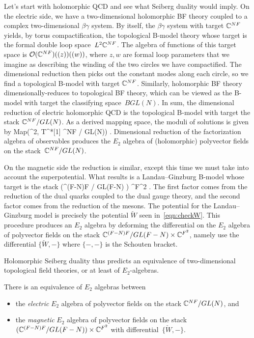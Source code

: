 \documentclass[11pt]{amsart}
\begin{document}
Let's start with holomorphic QCD and see what Seiberg duality would imply.
On the electric side, 
we have a two-dimensional holomorphic BF theory coupled to a complex two-dimensional $\beta\gamma$ system.
By itself, the $\beta\gamma$ system with target ${\mathbb{C}}^{NF}$ yields, by torus compactification, 
the topological B-model theory whose target is the formal double loop space~$L^2{\mathbb{C}}^{NF}$. 
The algebra of functions of this target space is $\mathcal O({\mathbb{C}}^{NF}) ((z))((w))$, 
where $z,w$ are formal loop parameters that we imagine as describing the winding of the two circles we have compactified. 
The dimensional reduction then picks out the constant modes along each circle, 
so we find a topological B-model with target ${\mathbb{C}}^{NF}$.
Similarly, holomorphic BF theory dimensionally-reduces to topological BF theory,
which can be viewed as the B-model with target the classifying space~$BGL(N)$.
In sum, the dimensional reduction of electric holomorphic QCD is the topological B-model with target the stack ${\mathbb{C}}^{NF} / GL(N)$.
As a derived mapping space, the moduli of solutions is given by
\beqn
{\rm Map}\left(\RR^2, T^*[1] \C^{NF} / GL(N)\right) .
\eeqn
Dimensional reduction of the factorization algebra of observables produces the $E_2$ algebra of (holomorphic) polyvector fields on the stack~${\mathbb{C}}^{NF} / GL(N)$. 

On the magnetic side the reduction is similar, except this time we must take into account the superpotential. 
What results is a Landau--Ginzburg B-model whose target is the stack
\beqn
\left(\C^{(F-N)F} / GL(F-N) \right) \times \C^{F^2} .
\eeqn
The first factor comes from the reduction of the dual quarks coupled to the dual gauge theory, and the second factor comes from the reduction of the mesons. 
The potential for the Landau--Ginzburg model is precisely the potential $\check{W}$ seen in~\eqref{eqn:checkW}.
This procedure produces an $E_2$ algebra by deforming the differential on the $E_2$ algebra of polyvector fields on the stack ${\mathbb{C}}^{(F-N)F} / GL(F-N) \times {\mathbb{C}}^{F^2}$, 
namely use the differential $\{\check{W},-\}$ where $\{-,-\}$ is the Schouten bracket.

Holomorphic Seiberg duality thus predicts an equivalence of two-dimensional topological field theories,
or at least of $E_2$-algebras.

\begin{conj*}
There is an equivalence of $E_2$ algebras between
\begin{itemize} 
\item the {\em electric} $E_2$ algebra of polyvector fields on the stack ${\mathbb{C}}^{NF} / GL(N)$, and 
\item the {\em magnetic} $E_2$ algebra of polyvector fields on the stack $({\mathbb{C}}^{(F-N)F} / GL(F-N)) \times {\mathbb{C}}^{F^2}$ with differential~$\{\check{W},-\}$. 
\end{itemize}
\end{conj*}
\end{document}
